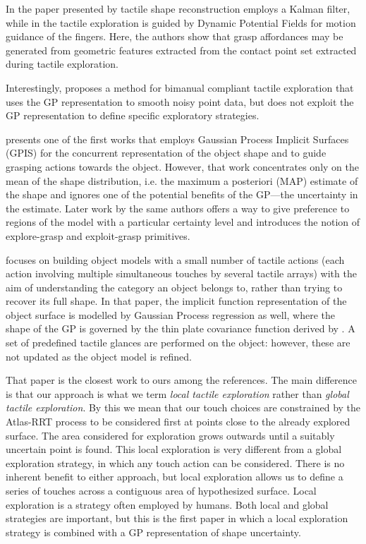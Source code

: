 In the paper presented by \cite{Meier2011Probabilistic} tactile shape reconstruction employs a Kalman filter, while in \cite{Bierbaum2008Potential} the tactile exploration is guided by Dynamic Potential Fields for motion guidance
of the fingers. Here, the authors show that grasp affordances may be generated from geometric features extracted from the contact point set extracted during tactile exploration.

Interestingly, \cite{Sommer2014Bimanual} proposes a method for bimanual compliant tactile exploration that uses the GP representation to smooth noisy point data, but does not exploit the GP representation to define specific exploratory strategies.

\cite{Dragiev2011Gaussian} presents one of the first works that employs Gaussian Process Implicit Surfaces (GPIS) for the concurrent representation of the object shape and to guide grasping actions towards the object. However, that work concentrates only on the mean of the shape distribution, i.e. the maximum a posteriori (MAP) estimate of the shape and ignores one of the potential benefits of the GP---the uncertainty in the estimate. Later work by the same authors \cite{Dragiev2013Uncertainty} offers a way to give preference to regions of the model with a particular certainty level and introduces the notion of explore-grasp and exploit-grasp primitives.

\cite{Bjorkman2013Enhancing} focuses on building object models with a small number of tactile actions (each action involving multiple simultaneous touches by several tactile arrays) with the aim of understanding the category an object belongs to, rather than trying to recover its full shape. In that paper, the implicit function representation of the object surface is modelled by Gaussian Process regression as well, where the shape of the GP is governed by the thin plate covariance function derived by \cite{Williams2007Gaussian}. A set of predefined tactile glances are performed on the object: however, these are not updated as the object model is refined. 

That paper is the closest work to ours among the references. The main difference is that our approach is what we term {\em local tactile exploration} rather than {\em global tactile exploration}. By this we mean that our touch choices are constrained by the Atlas-RRT process to be considered first at points close to the already explored surface. The area considered for exploration grows outwards until a suitably uncertain point is found. This local exploration is very different from a global exploration strategy, in which any touch action can be considered. There is no inherent benefit to either approach, but local exploration allows us to define a series of touches across a contiguous area of hypothesized surface. Local exploration is a strategy often employed by humans. Both local and global strategies are important, but this is the first paper in which a local exploration strategy is combined with a GP representation of shape uncertainty. 

